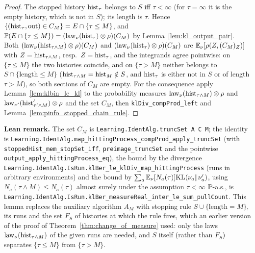 \begin{proof}
\leanok
The stopped history $\mathrm{hist}_\tau$ belongs to $S$ iff $\tau < \infty$ (for $\tau = \infty$ it is
the empty history, which is not in $S$); its length is $\tau$. Hence
$\{(\mathrm{hist}_\tau, \mathrm{out}) \in C_M\} = E \cap \{\tau \le M\}$, and
$\mathbb{P}(E \cap \{\tau \le M\}) = (\mathrm{law}_\nu(\mathrm{hist}_\tau)\otimes\rho)(C_M)$ by
Lemma~\ref{lem:kl_output_pair}. Both $(\mathrm{law}_\nu(\mathrm{hist}_{\tau\wedge M})\otimes\rho)(C_M)$ and
$(\mathrm{law}_\nu(\mathrm{hist}_\tau)\otimes\rho)(C_M)$ are
$\mathbb{E}_\nu[\rho(Z, (C_M)_Z)]$ with $Z = \mathrm{hist}_{\tau\wedge M}$, resp.\ $Z = \mathrm{hist}_\tau$, and the
integrands agree pointwise: on $\{\tau \le M\}$ the two histories coincide, and on
$\{\tau > M\}$ neither belongs to $S \cap \{\mathrm{length} \le M\}$
($\mathrm{hist}_{\tau\wedge M} = \mathrm{hist}_M \notin S$, and $\mathrm{hist}_\tau$ is either not in $S$ or of length
$\tau > M$), so both sections of $C_M$ are empty. For the consequence apply
Lemma~\ref{lem:klbin_le_kl} to the probability measures
$\mathrm{law}_\nu(\mathrm{hist}_{\tau\wedge M})\otimes\rho$ and
$\mathrm{law}_{\nu'}(\mathrm{hist}'_{\tau'\wedge M})\otimes\rho$ and the set $C_M$, then
\texttt{klDiv\_compProd\_left} and Lemma~\ref{lem:pinfo_stopped_chain_rule}.
\end{proof}

\textbf{Lean remark.} The set $C_M$ is \texttt{Learning.IdentAlg.truncSet A C M}; the identity is
\texttt{Learning.IdentAlg.map\_hittingProcess\_compProd\_apply\_truncSet} (with
\texttt{stoppedHist\_mem\_stopSet\_iff}, \texttt{preimage\_truncSet} and the pointwise
\texttt{output\_apply\_hittingProcess\_eq}), the bound by the divergence
\texttt{Learning.IdentAlg.IsRun.klBer\_le\_klDiv\_map\_hittingProcess} (runs in arbitrary
environments) and the bound by $\sum_a \mathbb{E}_\nu[N_a(\tau)]\mathrm{KL}(\nu_a\|\nu'_a)$, using
$N_a(\tau\wedge M) \le N_a(\tau)$ almost surely under the assumption $\tau < \infty$ $\mathbb{P}$-a.s.,
is \texttt{Learning.IdentAlg.IsRun.klBer\_measureReal\_inter\_le\_sum\_pullCount}. This lemma
replaces the auxiliary algorithm $A_M$ with stopping rule $S \cup \{\mathrm{length} = M\}$, its
runs and the set $F_S$ of histories at which the rule fires, which an earlier version of the
proof of Theorem~\ref{thm:change_of_measure} used: only the laws
$\mathrm{law}_\nu(\mathrm{hist}_{\tau\wedge M})$ of the given runs are needed, and $S$ itself (rather than
$F_S$) separates $\{\tau \le M\}$ from $\{\tau > M\}$.

